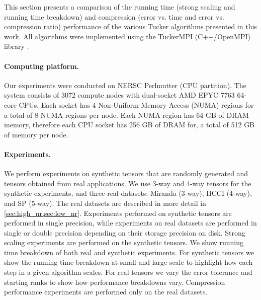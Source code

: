 
\newcommand{\datapath}{}
\newcommand{\errone}{}
\newcommand{\errtwo}{}
\newcommand{\errthree}{}
\newcommand{\error}{}
\newcommand{\test}{}
\newcommand{\thresh}{}

This section presents a comparison of the
running time (strong scaling and running time breakdown) and compression (error
vs. time and error vs. compression ratio) performance of the various Tucker
algorithms presented in this work. All algorithms were implemented using the
TuckerMPI (C++/OpenMPI) library \cite{BKK20}.

\paragraph{Computing platform.} Our experiments were conducted on
NERSC Perlmutter (CPU partition). The system consists of 3072 compute nodes with
dual-socket AMD EPYC 7763 64-core CPUs. Each socket has 4 Non-Uniform Memory
Access (NUMA) regions for a total of 8 NUMA regions per node. Each NUMA region
has 64 GB of DRAM memory, therefore each CPU socket has 256 GB of DRAM for, a
total of 512 GB of memory per node.

\paragraph{Experiments.} We perform experiments on synthetic tensors that are
randomly generated and tensors obtained from real applications. We use 3-way and
4-way tensors for the synthetic experiments, and three real datasets: Miranda
\cite{KD+20} (3-way), HCCI \cite{BCL14} (4-way), and SP \cite{KZCS16} (5-way).
The real datasets are described in more detail in \cref{sec:high_nr,sec:low_nr}.
Experiments performed on synthetic tensors are performed in single precision,
while experiments on real datasets are performed in single or double precision
depending on their storage precision on disk. Strong scaling experiments are
performed on the synthetic tensors. We show running time breakdown of both real
and synthetic experiments. For synthetic tensors we show the running time
breakdown at small and large scale to highlight how each step in a given
algorithm scales. For real tensors we vary the error tolerance and starting
ranks to show how performance breakdowns vary. Compression performance
experiments are performed only on the real datasets.

